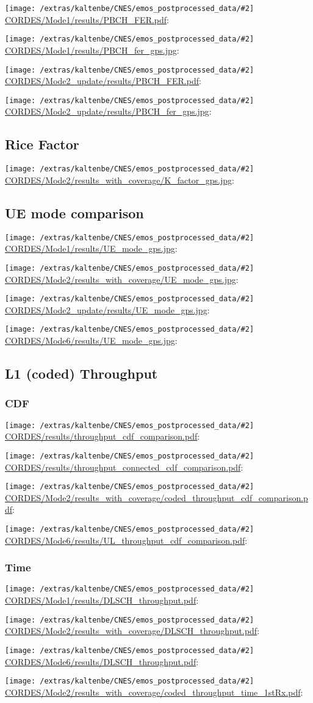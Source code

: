 \documentclass[a4paper,10pt]{article}
\newcommand{\printfile}[2][]{
 \begin{minipage}{8cm}
  \centering
  \texttt{[image: /extras/kaltenbe/CNES/emos\_postprocessed\_data/\#2]}
  \url{#2}: #1

 \end{minipage}
}
\begin{document}
\printfile{CORDES/Mode1/results/PBCH_FER.pdf}
\printfile{CORDES/Mode1/results/PBCH_fer_gps.jpg}

\printfile{CORDES/Mode2_update/results/PBCH_FER.pdf}
\printfile{CORDES/Mode2_update/results/PBCH_fer_gps.jpg}

\subsection{Rice Factor}

\printfile{CORDES/Mode2/results_with_coverage/K_factor_gps.jpg}

\subsection{UE mode comparison}

\printfile{CORDES/Mode1/results/UE_mode_gps.jpg}
\printfile{CORDES/Mode2/results_with_coverage/UE_mode_gps.jpg}

\printfile{CORDES/Mode2_update/results/UE_mode_gps.jpg}
\printfile{CORDES/Mode6/results/UE_mode_gps.jpg}

\subsection{L1 (coded) Throughput}


\subsubsection{CDF}


\printfile{CORDES/results/throughput_cdf_comparison.pdf}
\printfile{CORDES/results/throughput_connected_cdf_comparison.pdf}


\printfile{CORDES/Mode2/results_with_coverage/coded_throughput_cdf_comparison.pdf}
\printfile{CORDES/Mode6/results/UL_throughput_cdf_comparison.pdf}

\subsubsection{Time}

\printfile{CORDES/Mode1/results/DLSCH_throughput.pdf}
\printfile{CORDES/Mode2/results_with_coverage/DLSCH_throughput.pdf}

\printfile{CORDES/Mode6/results/DLSCH_throughput.pdf}
\printfile{CORDES/Mode2/results_with_coverage/coded_throughput_time_1stRx.pdf}
\end{document}
